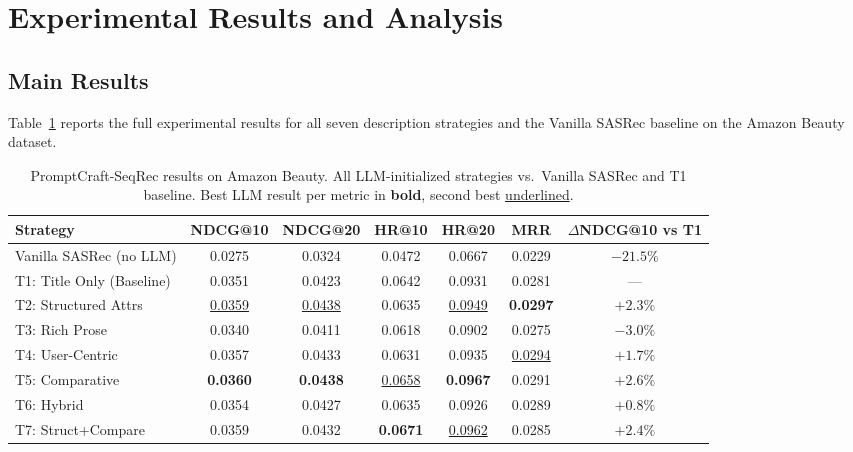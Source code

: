 \documentclass[12pt,a4paper]{report}
\begin{document}
\section{Experimental Results and Analysis}
\label{sec:promptcraft_results}

\subsection{Main Results}

Table~\ref{tab:promptcraft_main} reports the full experimental
results for all seven description strategies and the Vanilla
SASRec baseline on the Amazon Beauty dataset.

\begin{table}[ht]
\centering
\caption{PromptCraft-SeqRec results on Amazon Beauty. All LLM-initialized strategies vs.\ Vanilla SASRec and T1 baseline. Best LLM result per metric in \textbf{bold}, second best \underline{underlined}.}
\label{tab:promptcraft_main}
\renewcommand{\arraystretch}{1.3}
\small
\begin{adjustbox}{max width=\textwidth}
\begin{tabular}{@{} l c c c c c c @{}}
\toprule
\textbf{Strategy} &
\textbf{NDCG@10} & \textbf{NDCG@20} &
\textbf{HR@10} & \textbf{HR@20} &
\textbf{MRR} &
\textbf{$\Delta$NDCG@10 vs T1} \\
\midrule
Vanilla SASRec (no LLM)   & 0.0275 & 0.0324 & 0.0472 & 0.0667 & 0.0229 & $-21.5\%$ \\
\midrule
T1: Title Only (Baseline) & 0.0351 & 0.0423 & 0.0642 & 0.0931 & 0.0281 & --- \\
T2: Structured Attrs      & \underline{0.0359} & \underline{0.0438} & 0.0635 & \underline{0.0949} & \textbf{0.0297} & $+2.3\%$ \\
T3: Rich Prose            & 0.0340 & 0.0411 & 0.0618 & 0.0902 & 0.0275 & $-3.0\%$ \\
T4: User-Centric          & 0.0357 & 0.0433 & 0.0631 & 0.0935 & \underline{0.0294} & $+1.7\%$ \\
T5: Comparative           & \textbf{0.0360} & \textbf{0.0438} & \underline{0.0658} & \textbf{0.0967} & 0.0291 & $+\mathbf{2.6\%}$ \\
T6: Hybrid                & 0.0354 & 0.0427 & 0.0635 & 0.0926 & 0.0289 & $+0.8\%$ \\
T7: Struct+Compare        & 0.0359 & 0.0432 & \textbf{0.0671} & \underline{0.0962} & 0.0285 & $+2.4\%$ \\
\bottomrule
\end{tabular}
\end{adjustbox}
\end{table}
\end{document}
